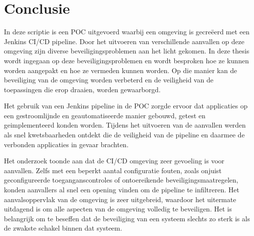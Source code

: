 
\chapter{Conclusie}%
\label{ch:conclusie}


In deze scriptie is een POC uitgevoerd waarbij een omgeving is gecreëerd met een Jenkins CI/CD pipeline. Door het uitvoeren van verschillende aanvallen op deze omgeving zijn diverse beveiligingsproblemen aan het licht gekomen. In deze thesis wordt ingegaan op deze beveiligingsproblemen en wordt besproken hoe ze kunnen worden aangepakt en hoe ze vermeden kunnen worden. Op die manier kan de beveiliging van de omgeving worden verbeterd en de veiligheid van de toepassingen die erop draaien, worden gewaarborgd.
\newline

Het gebruik van een Jenkins pipeline in de POC zorgde ervoor dat applicaties op een gestroomlijnde en geautomatiseerde manier gebouwd, getest en geimplementeerd konden worden. Tijdens het uitvoeren van de aanvallen werden als snel kwetsbaarheden ontdekt die de veiligheid van de pipeline en daarmee de verbonden applicaties in gevaar brachten.
\newline

Het onderzoek toonde aan dat de CI/CD omgeving zeer gevoeling is voor aanvallen. Zelfs met een beperkt aantal configuratie fouten, zoals onjuist geconfigureerde toeganganscontroles of ontoereikende beveiligingsmaatregelen, konden aanvallers al snel een opening vinden om de pipeline te infiltreren. Het aanvalsoppervlak van de omgeving is zeer uitgebreid, waardoor het uitermate uitdagend is om alle aspecten van de omgeving volledig te beveiligen. Het is belangrijk om te beseffen dat de beveiliging van een systeem slechts zo sterk is als de zwakste schakel binnen dat systeem.
\clearpage

